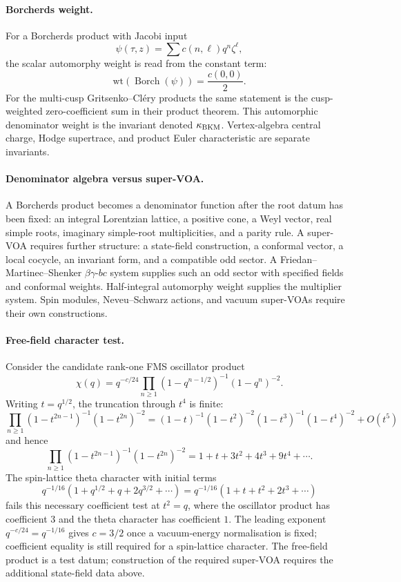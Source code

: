 \paragraph{Borcherds weight.}
For a Borcherds product with Jacobi input
\[
  \psi(\tau,z)=\sum c(n,\ell)q^n\zeta^\ell ,
\]
the scalar automorphy weight is read from the constant term:
\[
  \mathrm{wt}(\operatorname{Borch}(\psi))=\frac{c(0,0)}{2}.
\]
For the multi-cusp Gritsenko--Cl\'ery products the same statement is the
cusp-weighted zero-coefficient sum in their product theorem.  This
automorphic denominator weight is the invariant denoted \(\kappa_{\mathrm{BKM}}\).
Vertex-algebra central charge, Hodge supertrace, and product Euler
characteristic are separate invariants.

\paragraph{Denominator algebra versus super-VOA.}
A Borcherds product becomes a denominator function after the root datum
has been fixed: an integral Lorentzian lattice, a positive cone, a Weyl
vector, real simple roots, imaginary simple-root multiplicities, and a
parity rule.  A super-VOA requires further structure: a state-field
construction, a conformal vector, a local cocycle, an invariant form,
and a compatible odd sector.  A Friedan--Martinec--Shenker
\(\beta\gamma\)-\(bc\) system supplies such an odd sector with specified
fields and conformal weights.  Half-integral automorphy weight
supplies the multiplier system.  Spin modules, Neveu--Schwarz actions,
and vacuum super-VOAs require their own constructions.

\paragraph{Free-field character test.}
Consider the candidate rank-one FMS oscillator product
\[
\chi(q)=
q^{-c/24}
\prod_{n\geq 1}(1-q^{n-1/2})^{-1}(1-q^n)^{-2}.
\]
Writing \(t=q^{1/2}\), the truncation through \(t^4\) is finite:
\[
  \prod_{n\geq 1}(1-t^{2n-1})^{-1}(1-t^{2n})^{-2}
  =
  (1-t)^{-1}(1-t^2)^{-2}(1-t^3)^{-1}(1-t^4)^{-2}
  +O(t^5)
\]
and hence
\[
  \prod_{n\geq 1}(1-t^{2n-1})^{-1}(1-t^{2n})^{-2}
  =
  1+t+3t^2+4t^3+9t^4+\cdots .
\]
The spin-lattice theta character with initial terms
\[
  q^{-1/16}(1+q^{1/2}+q+2q^{3/2}+\cdots)
  =
  q^{-1/16}(1+t+t^2+2t^3+\cdots)
\]
fails this necessary coefficient test at \(t^2=q\), where the oscillator
product has coefficient \(3\) and the theta character has coefficient
\(1\).  The leading exponent \(q^{-c/24}=q^{-1/16}\) gives \(c=3/2\)
once a vacuum-energy normalisation is fixed; coefficient equality
is still required for a spin-lattice character.  The free-field product
is a test datum; construction of the required super-VOA requires the
additional state-field data above.

